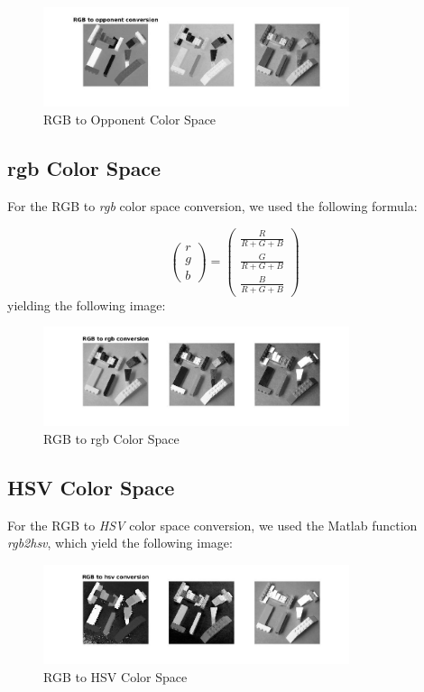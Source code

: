 \documentclass[11pt]{article}
\begin{document}
\begin{figure}[H]
    \centering
    \includegraphics[width=0.8\textwidth]{bricks_to_opponent.jpg}
    \caption{RGB to Opponent Color Space}
    \label{fig:opponent_color}
\end{figure}


\subsection{rgb Color Space}
For the RGB to \textit{rgb} color space conversion, we used the following formula:

$$
\begin{pmatrix}
	r \\
	g 	\\
	b
\end{pmatrix} = 
\begin{pmatrix}
	\frac{R}{R + G + B}			\\
	\frac{G}{R + G + B}		\\
	\frac{B}{R + G + B}
\end{pmatrix}
$$
yielding the following image:

\begin{figure}[H]
    \centering
    \includegraphics[width=0.8\textwidth]{bricks_to_rgb.jpg}
    \caption{RGB to rgb Color Space}
    \label{fig:rgb_color}
\end{figure}


\subsection{HSV Color Space}
For the RGB to \textit{HSV} color space conversion, we used the Matlab function \textit{rgb2hsv}, which yield the following image:

\begin{figure}[H]
    \centering
    \includegraphics[width=0.8\textwidth]{bricks_to_hsv.jpg}
    \caption{RGB to HSV Color Space}
    \label{fig:hsv_color}
\end{figure}
\end{document}
